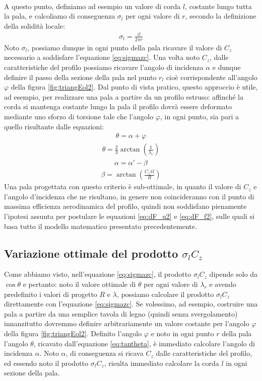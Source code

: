 \\
A questo punto, definiamo ad esempio un valore di corda $l$, costante lungo  tutta la pala, e calcoliamo di conseguenza $\sigma_l$ per ogni valore di $r$, secondo la definizione della solidità locale:
\begin{align*}
\sigma_l = \frac{z l}{2 \pi r}
\end{align*}
Noto $\sigma_l$, possiamo dunque in ogni punto della pala ricavare il valore di $C_z$ necessario a soddisfare l'equazione \ref{eq:sigmazc}. Una volta noto $C_z$, dalle caratteristiche del profilo possiamo ricavare l'angolo di incidenza $\alpha$ e dunque definire il passo della sezione della pala nel punto $r_l$ cioè corrispondente all'angolo $\varphi$ della figura \ref{fig:triangEol2}. Dal punto di vista pratico, questo approccio è utile, ad esempio, per realizzare una pala a partire da un profilo estruso: affinché la corda si mantenga costante lungo la pala il profilo dovrà essere deformato mediante uno sforzo di torsione tale che l'angolo $\varphi$, in ogni punto, sia pari a quello risultante dalle equazioni:
\begin{align*}
\theta = \alpha + \varphi
\end{align*}
\begin{align*}
\theta = \frac{2}{3} \arctan \left( \frac{1}{\lambda_r} \right)
\end{align*}
\begin{align*}
\alpha = \alpha' - \beta
\end{align*}
\begin{align*}
\beta = \arctan \left( \frac{C_z \pi l}{R} \right)
\end{align*}
Una pala progettata con questo criterio è sub-ottimale, in quanto il valore di $C_z$ e l'angolo d'incidenza che ne risultano, in genere non coincideranno con il punto di massima efficienza aerodinamica del profilo, quindi non soddisfano pienamente l'ipotesi assunta per postulare le equazioni \ref{eq:dF_u2} e \ref{eq:dF_f2}, sulle quali si basa tutto il modello matematico presentato precedentemente.

\subsection{Variazione ottimale del prodotto $\sigma_l C_z$}
Come abbiamo visto, nell'equazione \ref{eq:sigmazc}, il prodotto $\sigma_l C_z$ dipende solo da $\cos \theta$ e pertanto: noto il valore ottimale di $\theta$ per ogni valore di $\lambda_r$ e avendo predefinito i valori di progetto $R$ e $\lambda$, possiamo calcolare il prodotto $\sigma_l C_z$ direttamente con l'equazione \ref{eq:sigmazc}. Se volessimo, ad esempio, costruire una pala a partire da una semplice tavola di legno (quindi senza svergolamento) innanzitutto dovremmo definire arbitrariamente un valore costante per l'angolo $\varphi$ della figura \ref{fig:triangEol2}. Definito l'angolo $\varphi$ e noto in ogni punto $r$ della pala l'angolo $\theta$, ricavato dall'equazione \ref{eq:tantheta}, è immediato calcolare l'angolo di incidenza $\alpha$. Noto $\alpha$, di conseguenza si ricava $C_z$ dalle caratteristiche del profilo, ed essendo noto il prodotto $\sigma_l C_z$, risulta immediato calcolare la corda $l$ in ogni sezione della pala.

